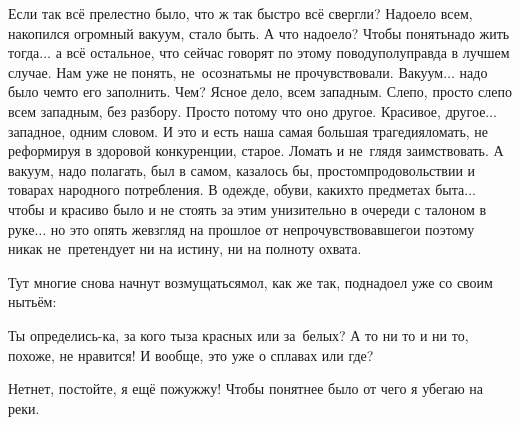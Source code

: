 Если так всё прелестно было, что ж так быстро всё свергли? Надоело всем, накопился огромный вакуум, стало быть. А что надоело? Чтобы понять\mdash надо жить тогда$\ldots$ а всё остальное, что сейчас говорят по этому поводу\mdash полуправда в лучшем случае. Нам уже не понять, не~осознать\mdash мы не прочувствовали. Вакуум$\ldots$ надо было чем\sdash то его заполнить. Чем? Ясное дело, всем западным. Слепо, просто слепо всем западным, без разбору. Просто потому что оно другое. Красивое, другое$\ldots$ западное, одним словом. И это и есть наша самая большая трагедия\mdash ломать, не реформируя в здоровой конкуренции, старое. Ломать и не~глядя заимствовать. А вакуум, надо полагать, был в самом, казалось бы, простом\mdash продовольствии и товарах народного потребления. В одежде, обуви, каких\sdash то предметах быта$\ldots$ чтобы и красиво было и не стоять за этим унизительно в очереди с талоном в руке$\ldots$ но это опять же\mdash взгляд на прошлое от непрочувствовавшего\mdash и поэтому никак не~претендует ни на истину, ни на полноту охвата.

Тут многие снова начнут возмущаться\mdash мол, как же так, поднадоел уже со своим нытьём:

\diagdash Ты определись-ка, за кого ты\mdash за красных или за~белых? А то ни то и ни то, похоже, не нравится! И вообще, это уже о сплавах или где? 

\diagdash Нет\sdash нет, постойте, я ещё пожужжу! Чтобы понятнее было от чего я убегаю на реки. %


